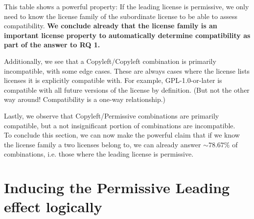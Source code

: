 This table shows a powerful property: If the leading license is permissive, we only need to know the license family of the subordinate license to be able to assess compatibility. \textbf{We conclude already that the license family is an important license property to automatically determine compatibility as part of the answer to RQ 1.}

Additionally, we see that a Copyleft/Copyleft combination is primarily incompatible, with some edge cases. These are always cases where the license lists licenses it is explicitly compatible with. For example, GPL-1.0-or-later is compatible with all future versions of the license by definition. (But not the other way around! Compatibility is a one-way relationship.)

Lastly, we observe that Copyleft/Permissive combinations are primarily compatible, but a not insignificant portion of combinations are incompatible. \\

To conclude this section, we can now make the powerful claim that if we know the license family a two licenses belong to, we can already answer $\sim 78.67\%$ of combinations, i.e. those where the leading license is permissive.

\section{Inducing the Permissive Leading effect logically}

